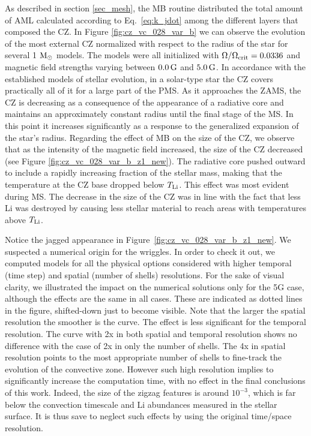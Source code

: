 \documentclass[fleqn,usenatbib]{mnras}
\begin{document}
As described in section \ref{sec_mesh}, the MB routine distributed the total amount of AML calculated according to Eq.~\ref{eq:k_jdot} among the different layers that composed the CZ. In Figure \ref{fig:cz_vc_028_var_b} we can observe the evolution of the most external CZ normalized with respect to the radius of the star for several 1 $\mathrm{M}_\odot$ models. The models were all initialized with $\Omega / \Omega_{\mathrm{crit}}=0.0336$ and magnetic field strengths varying between $0.0\,\mathrm{G}$ and $5.0\,\mathrm{G}$. In accordance with the established models of stellar evolution, in a solar-type star the CZ covers practically all of it for a large part of the PMS. As it approaches the ZAMS, the CZ is decreasing as a consequence of the appearance of a radiative core and maintains an approximately constant radius until the final stage of the MS. In this point it increases significantly as a response to the generalized expansion of the star's radius. Regarding the effect of MB on the size of the CZ, we observe that as the intensity of the magnetic field increased, the size of the CZ decreased (see Figure \ref{fig:cz_vc_028_var_b_z1_new}). The radiative core pushed outward to include a rapidly increasing fraction of the stellar mass, making that the temperature at the CZ base dropped below $T_{\mathrm{Li}}$. This effect was most evident during MS. The decrease in the size of the CZ was in line with the fact that less Li was destroyed by causing less stellar material to reach areas with temperatures above $T_{\mathrm{Li}}$.\par

Notice the jagged appearance in Figure~\ref{fig:cz_vc_028_var_b_z1_new}. We suspected a numerical origin for the wriggles. In order to check it out, we computed models for all the physical options considered with higher temporal (time step) and spatial (number of shells) resolutions. For the sake of visual clarity, we illustrated the impact on the numerical solutions only for the 5G case, although the effects are the same in all cases. These are indicated as dotted lines in the figure, shifted-down just to become visible. Note that the larger the spatial resolution the smoother is the curve. The effect is less significant for the temporal resolution. The curve with 2x in both spatial and temporal resolution shows no difference with the case of 2x in only the number of shells. The 4x in spatial resolution points to the most appropriate number of shells to fine-track the evolution of the convective zone. However such high resolution implies to significantly increase the computation time, with no effect in the final conclusions of this work. Indeed, the size of the zigzag features is around $10^{-3}$,  which is far below the convection timescale and Li abundances measured in the stellar surface. It is thus save to neglect such effects by using the original time/space resolution.
\end{document}
